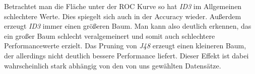 Betrachtet man die Fl\"ache unter der ROC Kurve so hat \emph{ID3} im Allgemeinen schlechtere Werte. Dies spiegelt sich auch in der Accuracy wieder. Au\ss erdem erzeugt \emph{ID3} immer einen gr\"o\ss eren Baum. Man kann also deutlich erkennen, das ein gro\ss er Baum schlecht veralgemeinert und somit auch schlechtere Performancewerte erzielt. Das Pruning von \emph{J48} erzeugt einen kleineren Baum, der allerdings nicht deutlich bessere Performance liefert. Dieser Effekt ist dabei wahrscheinlich stark abh\"angig von den von uns gew\"ahlten Datens\"atze.